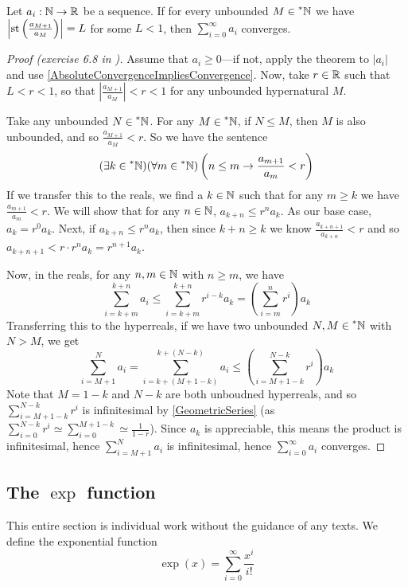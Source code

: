 \begin{thm}\label{RatioTest}
    Let $a_i: \mathbb{N} \to \mathbb{R}$ be a sequence. If for every unbounded $M \in \prescript{*}{}{\mathbb{N}}$ we have $\left|\operatorname{st}\left(\frac{a_{M+1}}{a_M}\right)\right| = L$ for some $L < 1$, then $\sum_{i=0}^\infty a_i$ converges.
\end{thm}

\begin{proof}[Proof (exercise 6.8 in \cite{goldblatt1998})]
    Assume that $a_i \geq 0$---if not, apply the theorem to $|a_i|$ and use \ref{AbsoluteConvergenceImpliesConvergence}. Now, take $r \in \mathbb{R}$ such that $L < r < 1$, so that $\left|\frac{a_{M+1}}{a_M}\right| < r < 1$ for any unbounded hypernatural $M$.

    Take any unbounded $N \in \prescript{*}{}{\mathbb{N}}$. For any $M \in \prescript{*}{}{\mathbb{N}}$, if $N \leq M$, then $M$ is also unbounded, and so $\frac{a_{M+1}}{a_M} < r$. So we have the sentence
    \[ (\exists k \in \prescript{*}{}{\mathbb{N}})(\forall m \in \prescript{*}{}{\mathbb{N}})\left(n \leq m \to \frac{a_{m+1}}{a_m} < r\right) \]
    If we transfer this to the reals, we find a $k \in \mathbb{N}$ such that for any $m \geq k$ we have $\frac{a_{m+1}}{a_m} < r$. We will show that for any $n \in \mathbb{N}$, $a_{k+n} \leq r^n a_k$. As our base case, $a_k = r^0 a_k$. Next, if $a_{k+n} \leq r^n a_k$, then since $k+n \geq k$ we know $\frac{a_{k+n+1}}{a_{k+n}} < r$ and so $a_{k+n+1} < r \cdot r^n a_k = r^{n+1}a_k$.

    Now, in the reals, for any $n, m \in \mathbb{N}$ with $n \geq m$, we have 
    \[ \sum_{i=k+m}^{k+n} a_i \leq \sum_{i=k+m}^{k+n} r^{i-k} a_k = \left(\sum_{i=m}^n r^i\right) a_k \]
    Transferring this to the hyperreals, if we have two unbounded $N, M \in \prescript{*}{}{\mathbb{N}}$ with $N > M$, we get
    \[ \sum_{i=M+1}^N a_i = \sum_{i=k+(M+1-k)}^{k+(N-k)} a_i \leq \left(\sum_{i=M+1-k}^{N-k} r^i \right) a_k \]
    Note that $M=1-k$ and $N-k$ are both unboudned hyperreals, and so $\sum_{i=M+1-k}^{N-k} r^i$ is infinitesimal by \ref{GeometricSeries} (as $\sum_{i=0}^{N-k} r^i \simeq \sum_{i=0}^{M+1-k} \simeq \frac{1}{1-r}$). Since $a_k$ is appreciable, this means the product is infinitesimal, hence $\sum_{i=M+1}^N a_i$ is infinitesimal, hence $\sum_{i=0}^\infty a_i$ converges.
\end{proof}

\subsection{The $\exp$ function}
This entire section is individual work without the guidance of any texts. We define the exponential function \[\exp(x) = \sum_{i=0}^\infty \frac{x^i}{i!}\]

